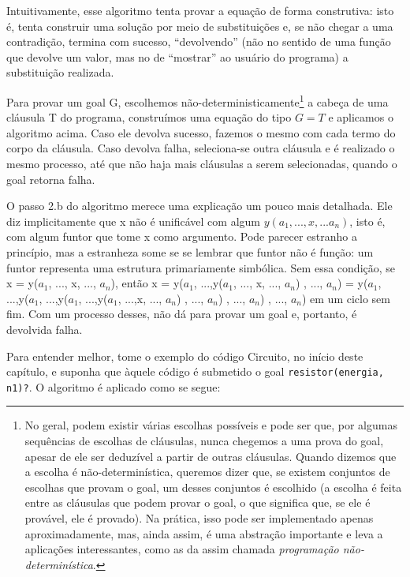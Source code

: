 \documentclass{article}
\theoremstyle{remark}
\theoremstyle{theorem}
\begin{document}
Intuitivamente, esse algoritmo tenta provar a equação de forma construtiva: isto é, tenta construir uma solução por meio de substituições e, se não chegar a uma contradição, termina com sucesso, ``devolvendo'' (não no sentido de uma função que devolve um valor, mas no de ``mostrar'' ao usuário do programa) a substituição realizada.

Para provar um goal G, escolhemos não-deterministicamente\footnote{No geral, podem existir várias escolhas possíveis e pode ser que, por algumas sequências de escolhas de cláusulas, nunca chegemos a uma prova do goal, apesar de ele ser deduzível a partir de outras cláusulas. Quando dizemos que a escolha é não-determinística, queremos dizer que, se existem conjuntos de escolhas que provam o goal, um desses conjuntos é escolhido (a escolha é feita entre as cláusulas que podem provar o
  goal, o que significa que, se ele é provável, ele é provado). Na prática, isso pode ser implementado apenas aproximadamente, mas, ainda assim, é uma abstração importante e leva a aplicações interessantes, como as da assim chamada \textit{programação não-determinística}.} a cabeça de uma cláusula T do programa, construímos uma equação do tipo $G = T$ e aplicamos o algoritmo acima. Caso ele devolva sucesso, fazemos o mesmo com cada termo do corpo da cláusula. Caso devolva falha, seleciona-se outra cláusula e é realizado o mesmo processo, até que não haja mais cláusulas a serem selecionadas, quando o goal retorna falha.

O passo 2.b do algoritmo merece uma explicação um pouco mais detalhada. Ele diz implicitamente que x não é unificável com algum $y(a_1, ...,x, ...a_n)$, isto é, com algum funtor que tome x como argumento. Pode parecer estranho a princípio, mas a estranheza some se se lembrar que funtor não é função: um funtor representa uma estrutura primariamente simbólica. Sem essa condição, se x = y($a_1$, ..., x, ..., $a_n$), então x = y($a_1$, ...,y($a_1$, ..., x, ..., $a_n$) , ...,
$a_n$) = y($a_1$, ...,y($a_1$, ...,y($a_1$, ...,y($a_1$,
...,x, ..., $a_n$) , ..., $a_n$) , ..., $a_n$) , ..., $a_n$) em um ciclo sem fim. Com um processo desses, não dá para provar um goal e, portanto, é devolvida falha.

Para entender melhor, tome o exemplo do código Circuito, no início deste capítulo, e suponha que àquele código é submetido o goal {\tt resistor(energia, n1)?}. O algoritmo é aplicado como se segue:
\end{document}
